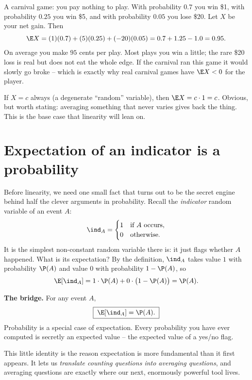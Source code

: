 \begin{example}
\label{ch08:ex-loaded-bet}
A carnival game: you pay nothing to play. With probability $0.7$ you win \$1,
with probability $0.25$ you win \$5, and with probability $0.05$ you lose \$20.
Let $X$ be your net gain. Then
\[
  \E X = (1)(0.7) + (5)(0.25) + (-20)(0.05)
       = 0.7 + 1.25 - 1.0 = 0.95.
\]
On average you make $95$ cents per play. Most plays you win a little; the rare
\$20 loss is real but does not eat the whole edge. If the carnival ran this game
it would slowly go broke -- which is exactly why real carnival games have
$\E X < 0$ for the player.
\end{example}

\begin{example}
\label{ch08:ex-constant}
If $X = c$ always (a degenerate ``random'' variable), then $\E X = c\cdot 1 = c$.
Obvious, but worth stating: averaging something that never varies gives back the
thing. This is the base case that linearity will lean on.
\end{example}

\section{Expectation of an indicator is a probability}
\label{ch08:indicators}

Before linearity, we need one small fact that turns out to be the secret engine
behind half the clever arguments in probability. Recall the \emph{indicator}
random variable of an event $A$:
\[
  \ind_A = \begin{cases} 1 & \text{if } A \text{ occurs},\\ 0 & \text{otherwise.}\end{cases}
\]
It is the simplest non-constant random variable there is: it just flags whether
$A$ happened. What is its expectation? By the definition, $\ind_A$ takes value $1$
with probability $\P(A)$ and value $0$ with probability $1-\P(A)$, so
\[
  \E[\ind_A] = 1\cdot \P(A) + 0\cdot \bigl(1-\P(A)\bigr) = \P(A).
\]

\begin{formalbox}
\textbf{The bridge.} For any event $A$,
\[
  \boxed{\;\E[\ind_A] = \P(A).\;}
\]
Probability is a special case of expectation. Every probability you have ever
computed is secretly an expected value -- the expected value of a yes/no flag.
\end{formalbox}

This little identity is the reason expectation is more fundamental than it first
appears. It lets us \emph{translate counting questions into averaging questions},
and averaging questions are exactly where our next, enormously powerful tool
lives.

